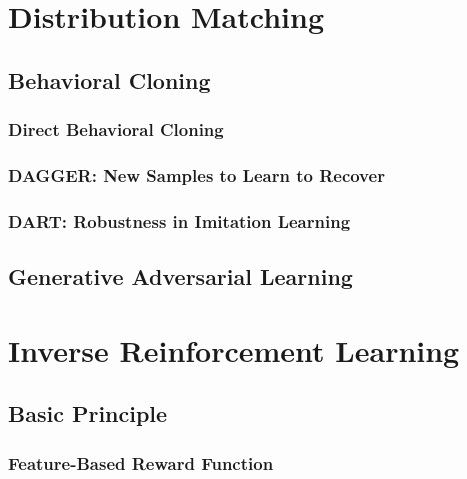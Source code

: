 	\section{Distribution Matching} %

		\subsection{Behavioral Cloning} %

			\subsubsection{Direct Behavioral Cloning} %

			\subsubsection{DAGGER: New Samples to Learn to Recover} %

			\subsubsection{DART: Robustness in Imitation Learning} %

		\subsection{Generative Adversarial Learning} %

	\section{Inverse Reinforcement Learning} %

		\subsection{Basic Principle} %

			\subsubsection{Feature-Based Reward Function} %

